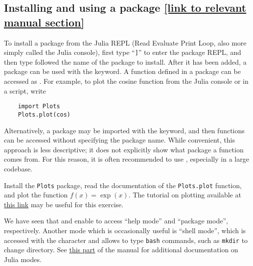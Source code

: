 
\subsection*{Installing and using a package {\footnotesize \href{https://docs.julialang.org/en/v1/stdlib/Pkg/}{[link to relevant manual section]}}}%
\label{sub:installing_and_using_a_package}
To install a package from the Julia REPL (Read Evaluate Print Loop, also more simply called the Julia console),
first type ``\texttt{]}'' to enter the package REPL,
and then type  followed the name of the package to install.
After it has been added, a package can be used with the  keyword.
A function  defined in a package  can be accessed as .
For example, to plot the cosine function from the Julia console or in a script, write
\begin{verbatim}
    import Plots
    Plots.plot(cos)
\end{verbatim}

Alternatively, a package may be imported with the  keyword,
and then functions can be accessed without specifying the package name.
While convenient, this approach is less descriptive;
it does not explicitly show what package a function comes from.
For this reason, it is often recommended to use ,
especially in a large codebase.

\begin{task}
    Install the \texttt{Plots} package,
    read the documentation of the \texttt{Plots.plot} function,
    and plot the function $f(x) = \exp(x)$.
    The tutorial on plotting available at \href{https://docs.juliaplots.org/latest/tutorial/} {this link}
    may be useful for this exercise.
\end{task}

\begin{remark}
    We have seen that  and \julia{]} enable to access ``help mode'' and ``package mode'', respectively.
    Another mode which is occasionally useful is ``shell mode'',
    which is accessed with the character \julia{;} and allows to type \texttt{bash} commands,
    such as \texttt{mkdir} to change directory.
    See \href{https://docs.julialang.org/en/v1/stdlib/REPL/}{this part} of the manual for additional documentation on Julia modes.
\end{remark}

